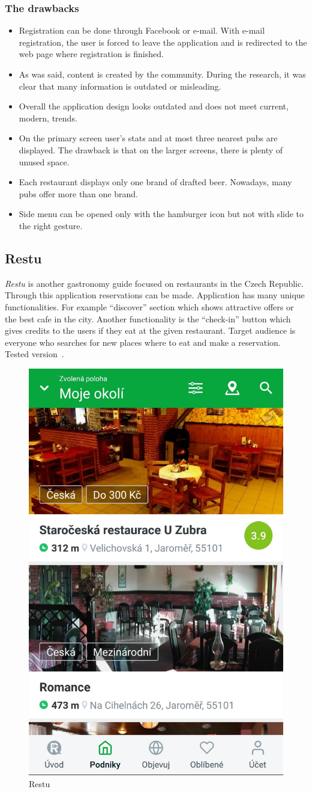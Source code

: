 \subsubsection{The drawbacks}
\begin{itemize}
    \item Registration can be done through Facebook or e-mail. With e-mail registration, the user is forced to leave the application and is redirected to the web page where registration is finished.
    \item As was said, content is created by the community. During the research, it was clear that many information is outdated or misleading. 
    \item Overall the application design looks outdated and does not meet current, modern,  trends.
    \item On the primary screen user's stats and at most three nearest pubs are displayed. The drawback is that on the larger screens, there is plenty of unused space. 
    \item Each restaurant displays only one brand of drafted beer. Nowadays, many pubs offer more than one brand. 
    \item Side menu can be opened only with the hamburger icon but not with slide to the right gesture.
\end{itemize}

\subsection{Restu}
\textit{Restu} is another gastronomy guide focused on restaurants in the Czech Republic. Through this application reservations can be made. Application has many unique functionalities. For example ``discover'' section which shows attractive offers or the best cafe in the city. Another functionality is the ``check-in'' button which gives credits to the users if they eat at the given restaurant. Target audience is everyone who searches for new places where to eat and make a reservation. Tested version~\cite{app-restu}.

\begin{figure}[ht]
    \centering
    \includegraphics[width=0.33\linewidth]{img/analysis/restu.jpg}
    \caption{Restu}
    \label{fig:restu}
\end{figure}

